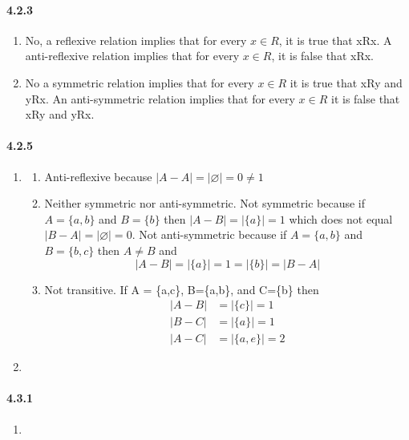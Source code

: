 \documentclass[11pt, letterpaper, twocolumn, fleqn]{article}
\let\emptyset\varnothing
\begin{document}
    \paragraph{4.2.3}
        \begin{enumerate}
            \item No, a reflexive relation implies that for every $x \in R$, it is true that xRx. A anti-reflexive relation implies that for every $x \in R$, it is false that xRx.
            \item No a symmetric relation implies that for every $x \in R$ it is true that xRy and yRx. An anti-symmetric relation implies that for every $x \in R$ it is false that xRy and yRx.
        \end{enumerate}
    
    \paragraph{4.2.5}
        \begin{enumerate}
            \item 
                \begin{enumerate}
                    \item Anti-reflexive because $|A-A| = |\emptyset| = 0 \neq 1$ \newline
                    \item Neither symmetric nor anti-symmetric. Not symmetric because if $A=\{a,b\}$ and $B=\{b\}$ then $|A-B| = |\{a\}| = 1$ which does not equal $|B-A| = |\emptyset| = 0$. Not anti-symmetric because if $A=\{a,b\}$ and $B=\{b,c\}$ then $A \neq B$ and 
                  $$|A-B| = |\{a\}| = 1 = |\{b\}| = |B-A|$$
                    \item Not transitive. If A = \{a,c\}, B=\{a,b\}, and C=\{b\} then 
                    \begin{align*}
                        |A-B| &= |\{c\}| = 1 \\
                        |B-C| &= |\{a\}| = 1 \\
                        |A-C| &= |\{a,e\}| = 2
                    \end{align*}

                \end{enumerate}
            \item
        \end{enumerate}
    
    \paragraph{4.3.1}
        \begin{enumerate}
            \item 
        \end{enumerate}
    
\end{document}
